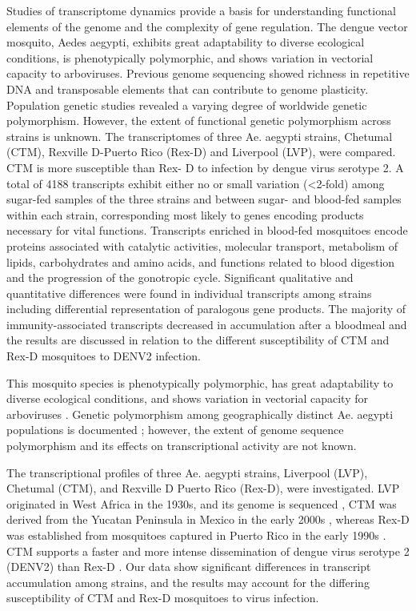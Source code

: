 
Studies of transcriptome dynamics provide a basis for understanding functional elements of the genome and the complexity of gene regulation. The dengue vector mosquito, Aedes aegypti, exhibits great adaptability to diverse ecological conditions, is phenotypically polymorphic, and shows variation in vectorial capacity to arboviruses. Previous genome sequencing showed richness in repetitive DNA and transposable elements that can contribute to genome plasticity. Population genetic studies revealed a varying degree of worldwide genetic polymorphism. However, the extent of functional genetic polymorphism across strains is unknown. The transcriptomes of three Ae. aegypti strains, Chetumal (CTM), Rexville D-Puerto Rico (Rex-D) and Liverpool (LVP), were compared. CTM is more susceptible than Rex- D to infection by dengue virus serotype 2. A total of 4188 transcripts exhibit either no or small variation (<2-fold) among sugar-fed samples of the three strains and between sugar- and blood-fed samples within each strain, corresponding most likely to genes encoding products necessary for vital functions. Transcripts enriched in blood-fed mosquitoes encode proteins associated with catalytic activities, molecular transport, metabolism of lipids, carbohydrates and amino acids, and functions related to blood digestion and the progression of the gonotropic cycle. Significant qualitative and quantitative differences were found in individual transcripts among strains including differential representation of paralogous gene products. The majority of immunity-associated transcripts decreased in accumulation after a bloodmeal and the results are discussed in relation to the different susceptibility of CTM and Rex-D mosquitoes to DENV2 infection.

This mosquito species is phenotypically polymorphic, has great adaptability to diverse ecological conditions, and shows variation in vectorial capacity for arboviruses \cite{Bennett2002,Black2002,Kuno2010}. Genetic polymorphism among geographically distinct Ae. aegypti populations is documented \cite{Urdaneta-Marquez2011}; however, the extent of genome sequence polymorphism and its effects on transcriptional activity are not known.

The transcriptional profiles of three Ae. aegypti strains, Liverpool (LVP), Chetumal (CTM), and Rexville D Puerto Rico (Rex-D), were investigated. LVP originated in West Africa in the 1930s, and its genome is sequenced \cite{Nene2007}, CTM was derived from the Yucatan Peninsula in Mexico in the early 2000s \cite{Bennet2002,Gubler1985,Richardson2006a}, whereas Rex-D was established from mosquitoes captured in Puerto Rico in the early 1990s \cite{Miller1991}. CTM supports a faster and more intense dissemination of dengue virus serotype 2 (DENV2) than Rex-D \cite{Bennet2002,Salazar2007}. Our data show significant differences in transcript accumulation among strains, and the results may account for the differing susceptibility of CTM and Rex-D mosquitoes to virus infection.


